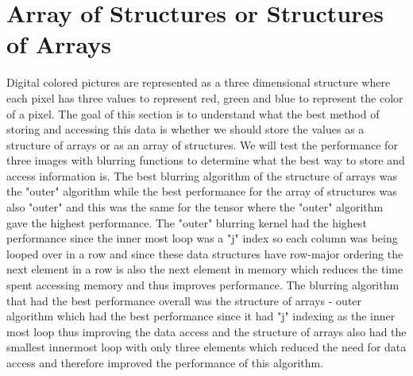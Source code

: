 \documentclass{article}
\begin{document}
\section{Array of Structures or Structures of Arrays}
Digital colored pictures are represented as a three dimensional structure where each pixel has three values to represent red, green and blue to represent the color of a pixel. The goal of this section is to understand what the best method of storing and accessing this data is whether we should store the values as a structure of arrays or as an array of structures. We will test the performance for three images with blurring functions to determine what the best way to store and access information is. The best blurring algorithm of the structure of arrays was the "outer" algorithm while the best performance for the array of structures was also "outer" and this was the same for the tensor where the "outer" algorithm gave the highest performance. The "outer" blurring kernel had the highest performance since the inner most loop was a "j" index so each column was being looped over in a row and since these data structures have row-major ordering the next element in a row is also the next element in memory which reduces the time spent accessing memory and thus improves performance. The blurring algorithm that had the best performance overall was the structure of arrays - outer 
	algorithm which had the best performance since it had "j" indexing as the inner most loop thus improving the data access and the structure of arrays also had the smallest innermost loop with only three elements which reduced the need for data access and therefore improved the performance of this algorithm. 


\end{document}
